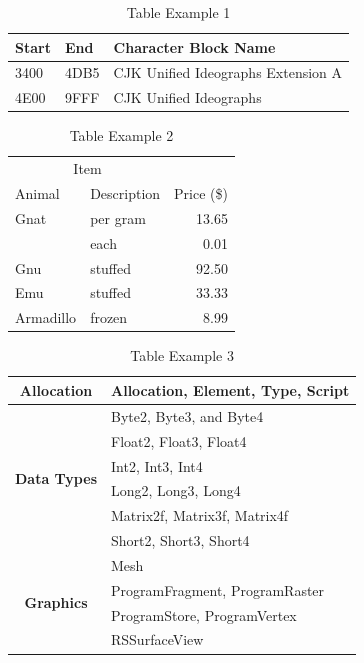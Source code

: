 \begin{table}[htpb]\begin{center}
\caption{Table Example 1}
\begin{tabularx}{8cm}{llX}
\hline
Start & End  & Character Block Name \\
\hline
3400  & 4DB5 & CJK Unified Ideographs Extension A \\
4E00  & 9FFF & CJK Unified Ideographs \\
\hline
\end{tabularx}
 \end{center}\end{table}

\begin{table}[htpb]\begin{center}
\caption{Table Example 2}
\begin{tabular}{llr}
\hline
\multicolumn{2}{c}{Item} \\
\cline{1-2}
Animal & Description & Price (\$) \\
\hline
Gnat  & per gram & 13.65 \\
      & each     &  0.01 \\
Gnu   & stuffed  & 92.50 \\
Emu   & stuffed  & 33.33 \\
Armadillo & frozen & 8.99 \\
\hline
\end{tabular}
 \end{center}\end{table}

 \begin{table}[htpb]\begin{center}
	\label{t:prefix-table}
	\caption{Table Example 3}
	\renewcommand{\arraystretch}{1.0}
	\begin{tabularx}{300pt}{|c|X| }
		\hline
		\multirow{1}{*}{\textbf{Allocation}} &
		Allocation, Element, Type, Script
		\\ \hline\hline
		\multirow{6}{*}{\textbf{Data Types}} &
        Byte2, Byte3, and Byte4\\ &
        Float2, Float3, Float4\\ &
        Int2, Int3, Int4\\ &
        Long2, Long3, Long4\\ &
        Matrix2f, Matrix3f, Matrix4f\\ &
        Short2, Short3, Short4
        \\ \hline\hline
		\multirow{4}{*}{\textbf{Graphics}} &
		Mesh\\&
		ProgramFragment, ProgramRaster\\&
		ProgramStore, ProgramVertex\\&
		RSSurfaceView
		\\ \hline
	\end{tabularx}
\end{center}\end{table}
